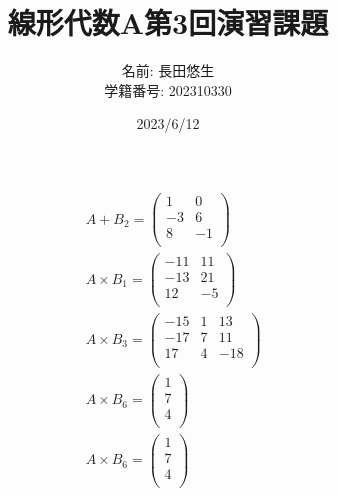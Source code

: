 \documentclass[dvipdfmx,uplatex]{jsarticle}
\title{線形代数A第3回演習課題}
\author{
    名前: 長田悠生\\
    学籍番号: 202310330\\
}
\date{2023/6/12}
\begin{document}
  \begin{titlepage}
    \maketitle
    \begin{center}
      \textmc{\HUGE \LaTeX}
    \end{center}
    \thispagestyle{empty}
  \end{titlepage}

  \begin{equation}
    \begin{aligned}
        &A + {B}_{2} = \begin{pmatrix} 1 & 0 \\ -3 & 6 \\ 8 & -1 \\ \end{pmatrix} \nonumber\\
        &A \times {B}_{1} = \begin{pmatrix} -11 & 11 \\ -13 & 21 \\ 12 & -5 \\ \end{pmatrix} \nonumber\\
        &A \times {B}_{3} = \begin{pmatrix} -15 & 1 & 13 \\ -17 & 7 & 11 \\ 17 & 4 & -18 \\ \end{pmatrix} \nonumber\\
        &A \times {B}_{6} = \begin{pmatrix} 1 \\ 7 \\ 4 \\ \end{pmatrix} \nonumber\\
        &A \times {B}_{6} = \begin{pmatrix} 1 \\ 7 \\ 4 \\ \end{pmatrix} \nonumber\\
    \end{aligned}
  \end{equation}
\end{document}
